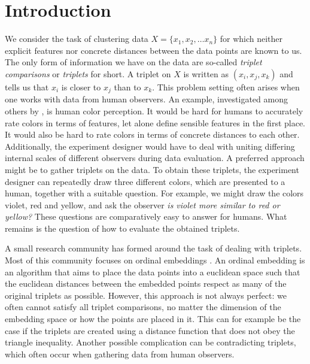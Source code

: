 \chapter{Introduction}\label{Introduction}
We consider the task of clustering data $X = \{x_1, x_2, \ldots x_n \}$ for which neither 
explicit features nor concrete distances between the data points are known to us. 
The only form of information we have on the data are so-called 
\textit{triplet comparisons} or \textit{triplets} for short. A triplet 
on $X$ is written as $(x_i, x_j, x_k)$ and tells us that $x_i$ is closer to $x_j$ than to $x_k$. 
This problem setting often arises when one works with data from human observers. 
An example, investigated among others by \cite{shepardAnalysisProximitiesMultidimensional1962}, 
is human color perception. It would be hard for humans to accurately rate colors in 
terms of features, let alone define sensible features in the first place.  It would also be hard to rate colors in terms of concrete distances to each other.
Additionally, the experiment designer would have to deal with uniting differing internal scales of different observers during data evaluation. 
A preferred approach might be to gather triplets on the data. 
To obtain these triplets, the experiment designer can repeatedly draw
three different colors, which are presented to a human, together with a 
suitable question. For example, we might draw the colors violet, red and yellow,
and ask the observer \textit{is violet more similar to red or yellow?} These questions
are comparatively easy to answer for humans. 
What remains is the question of how to evaluate the obtained triplets.

A small research community has formed around the task of dealing with triplets.
Most of this community focuses on ordinal embeddings
\citep{agarwalGeneralizedNonmetricMultidimensional2007, tamuzAdaptivelyLearningCrowd2011,
laurensvandermaatenStochasticTripletEmbedding2012,   teradaLocalOrdinalEmbedding2014, jainFiniteSamplePrediction2016, ghoshLandmarkOrdinalEmbedding2019, andertonScalingOrdinalEmbedding2019}.
An ordinal embedding is an algorithm that aims to place the data points into a euclidean space
such that the euclidean distances between the embedded points respect as many of the original triplets as possible. 
However, this approach is not always perfect: we often cannot satisfy all triplet comparisons, 
no matter the dimension of the embedding space or how the points are placed in it. 
This can for example be the case if the triplets are created using a distance function that does not obey the triangle inequality. Another possible complication can be contradicting triplets,
which often occur when gathering data from human observers. 

